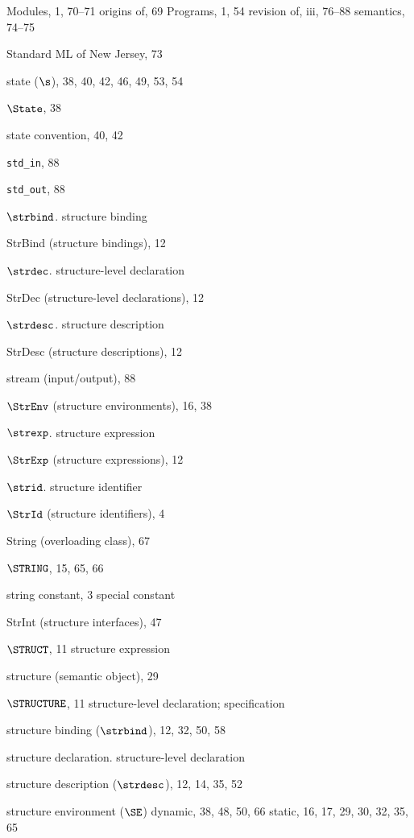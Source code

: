 \begin{theindex}
\subitem Modules, 1, 70--71
\subitem origins of, 69
\subitem Programs, 1, 54
\subitem revision of, iii, 76--88
\subitem semantics, 74--75
\item Standard ML of New Jersey, 73
\item state ($\s$), 38, 40, 42, 46, 49, 53, 54
\item $\State$, 38
\item state convention, 40, 42
\item \verb+std_in+, 88
\item \verb+std_out+, 88
\item $\strbind$. \see structure binding
\item StrBind (structure bindings), 12
\item $\strdec$. \see structure-level declaration
\item StrDec (structure-level declarations), 12
\item $\strdesc$. \see structure description
\item StrDesc (structure descriptions), 12
\item stream (input/output),  88
\item $\StrEnv$ (structure environments), 16, 38
\item $\strexp$. \see  structure expression
\item $\StrExp$ (structure expressions), 12
\item $\strid$. \see structure identifier
\item $\StrId$ (structure identifiers), 4
\item String (overloading class), 67
\item $\STRING$, 15, 65, 66
\item string constant, 3
\subitem \seealso special constant
\item StrInt (structure interfaces), 47
\item $\STRUCT$, 11
\subitem \seealso structure expression
\item structure (semantic object), 29
\item $\STRUCTURE$, 11
\subitem \seealso structure-level declaration; specification
\item structure binding ($\strbind$), 12, 32, 50, 58
\item structure declaration. \see structure-level declaration
\item structure description ($\strdesc$), 12, 14, 35, 52
\item structure environment ($\SE$)
\subitem dynamic, 38, 48, 50, 66
\subitem static, 16,  17, 29, 30, 32, 35, 65

\end{theindex}
